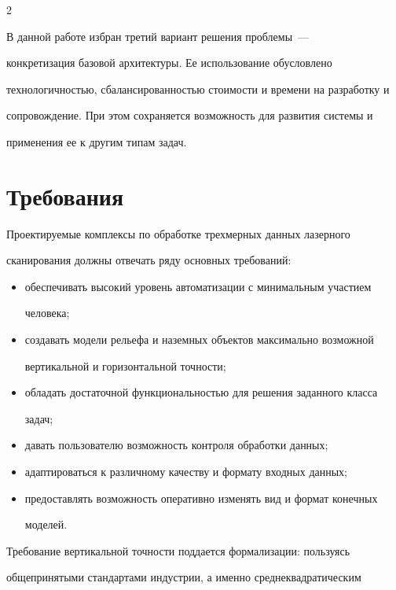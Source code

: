 \begin{multicols}{2}
   

   В данной работе избран третий вариант решения проблемы~--- 

конкретизация базовой архитектуры. Ее использование обусловлено 

технологичностью, сбалансированностью стоимости и времени на разработку и 

сопровождение. При этом сохраняется возможность для развития системы и 

применения ее к другим типам задач.

   

\section{Требования}

   

   Проектируемые комплексы по обработке трехмерных данных лазерного 

сканирования должны отвечать ряду основных требований:

   \begin{itemize}

\item обеспечивать высокий уровень автоматизации с минимальным участием 

человека;

\item создавать модели рельефа и наземных объектов максимально возможной 

вертикальной и горизонтальной точности;

\item обладать достаточной функциональностью для решения заданного класса 

задач;

\item давать пользователю возможность контроля обработки данных;

\item адаптироваться к различному качеству и формату входных данных;

\item предоставлять возможность оперативно изменять вид и формат конечных 

моделей.

\end{itemize}



Требование вертикальной точности поддается формализации: пользуясь 

общепринятыми стандартами индустрии, а именно среднеквадратическим 


\end{multicols}
